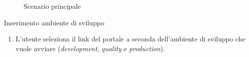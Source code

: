 \begin{figure}[h]
    \centering
    \caption{Scenario principale}\label{fig:usecase-scenario-principale}
\end{figure}

\clearpage    


\begin{usecase}{1}{Inserimento ambiente di sviluppo}\label{uc:inserimento-ambiente-di-sviluppo}

    \usecasemain{}
        \begin{enumerate}
            \item L'utente seleziona il link del portale a seconda dell'ambiente di sviluppo che vuole avviare (\textit{development}, \textit{quality} e \textit{production}).
        \end{enumerate}

\end{usecase}

